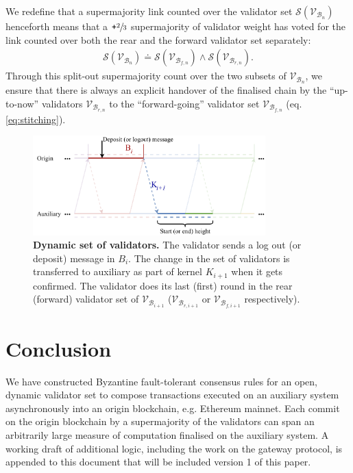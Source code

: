 \documentclass[12pt,a4paper]{article}
\begin{document}
We redefine that a supermajority link counted over the validator set $\mathcal{S}(\mathcal{V}_{\mathcal{B}_n})$ henceforth means that a $\texttt{+}\sfrac{2}{3}$ supermajority of validator weight has voted for the link counted over both the rear and the forward validator set separately:
\begin{align}
  \label{eq:supermajority}
  \mathcal{S}(\mathcal{V}_{\mathcal{B}_n}) \doteq \mathcal{S}(\mathcal{V}_{\mathcal{B}_{f,n}}) \land \mathcal{S}(\mathcal{V}_{\mathcal{B}_{r,n}}).
\end{align}
Through this split-out supermajority count over the two subsets of $\mathcal{V}_{\mathcal{B}_{n}}$, we ensure that there is always an explicit handover of the finalised chain by the ``up-to-now'' validators $\mathcal{V}_{\mathcal{B}_{r,n}}$ to the ``forward-going'' validator set $\mathcal{V}_{\mathcal{B}_{f,n}}$ (eq. \ref{eq:stitching}).
\begin{figure}[htb]
    \centering
	\includegraphics[width=0.8\textwidth]{dynamic_validators}
	\caption{\textbf{Dynamic set of validators.}
		The validator sends a log out (or deposit) message in $B_i$.
		The change in the set of validators is transferred to auxiliary as part of kernel $K_{i+1}$ when it gets confirmed.
		The validator does its last (first) round in the rear (forward) validator set of $\mathcal{V}_{\mathcal{B}_{i+1}}$ ($\mathcal{V}_{\mathcal{B}_{r,i+1}}$ or $\mathcal{V}_{\mathcal{B}_{f,i+1}}$ respectively).}
	\label{fig:dynamic_validators}
\end{figure}

\section*{Conclusion}
We have constructed Byzantine fault-tolerant consensus rules for an open, dynamic validator set to compose transactions executed on an auxiliary system asynchronously into an origin blockchain, e.g. Ethereum mainnet.
Each commit on the origin blockchain by a supermajority of the validators can span an arbitrarily large measure of computation finalised on the auxiliary system. A working draft of additional logic, including the work on the gateway protocol, is appended to this document that will be included version 1 of this paper.
\end{document}
